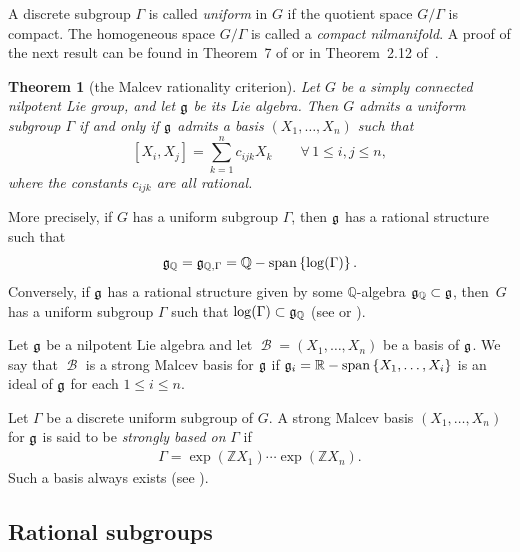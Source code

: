 \documentclass[11pt]{article}
\newtheorem{theorem}{Theorem}
\providecommand{\mathds}[1]{\mathbb{#1}}
\newcommand{\set}[1]{\left\{#1\right\}}
\DeclareMathOperator{\spann}{\mathds{R}-span}
\DeclareMathOperator{\spannq}{\mathds{Q}-span}
\DeclareMathOperator{\bbase}{\mathscr{B}}
\begin{document}
 A discrete subgroup $\Gamma$ is
called \textit{uniform} in $G$ if the quotient space $G/\Gamma$ is
compact. The homogeneous space $G/\Gamma$ is called a
\textit{compact nilmanifold}. A proof of the next result can be
found in Theorem~7 of \cite{Malcev1} or in Theorem~2.12 of~\cite{Raghunathan}.


\begin{theorem}[the Malcev rationality criterion] \label{Malcev-cri}
Let $G$ be a simply connected nilpotent Lie
group, and let $\frak g$ be its Lie algebra. Then $G$ admits a
uniform subgroup $\Gamma$ if and only if $\frak g$ admits a basis
$(X_1,\dotsc,X_n)$ such that
\[
[X_i, X_j] =  \sum_{k=1}^n c_{ijk} X_k\qquad \forall\,  1\leq i, j\leq n,
\]
 where the constants $c_{ijk}$ are all
rational.
\end{theorem}



More precisely, if $G$ has a uniform subgroup $\Gamma$, then $\frak
g$  has a rational structure such that
\[
\frak g_\mathds{Q}= \frak g_{\mathds{Q}, \Gamma}= \spannq\set{\log(\Gamma)}.
\]
 Conversely, if
$\frak g$ has a rational structure given by some
$\mathds{Q}$-algebra $\frak g_\mathds{Q}\subset \frak g$, then~$G$
has a uniform subgroup $\Gamma$ such that $\log(\Gamma) \subset
\frak g_\mathds{Q}$ (see \cite{Cor1} or \cite{Malcev1}).





\begin{definition} Let $\frak g$ be a nilpotent Lie algebra and let
$\bbase=(X_1, \ldots, X_n)$ be a basis of $\frak g$.
 We say that $\bbase$ is a  strong  Malcev
basis for $\frak g$ if  $\frak g_i=\spann\set{X_1, \ldots, X_i}$ is
 an ideal of $\frak g$ for each $1\leq i\leq n$.
\end{definition}


  Let $
\Gamma$ be a discrete uniform subgroup of $G$. A strong Malcev basis
$(X_1,\dotsc,X_n)$ for $\frak g$ is said to be \textit{strongly
based on} $\Gamma$ if
\begin{gather*}%
\Gamma= \exp(\mathds{Z}X_1)\dotsb \exp(\mathds{Z}X_n).
\end{gather*}
 Such a basis always exists (see \cite{Cor1,Matsushima1}).

\subsection{Rational subgroups}\label{2.4}
\end{document}
